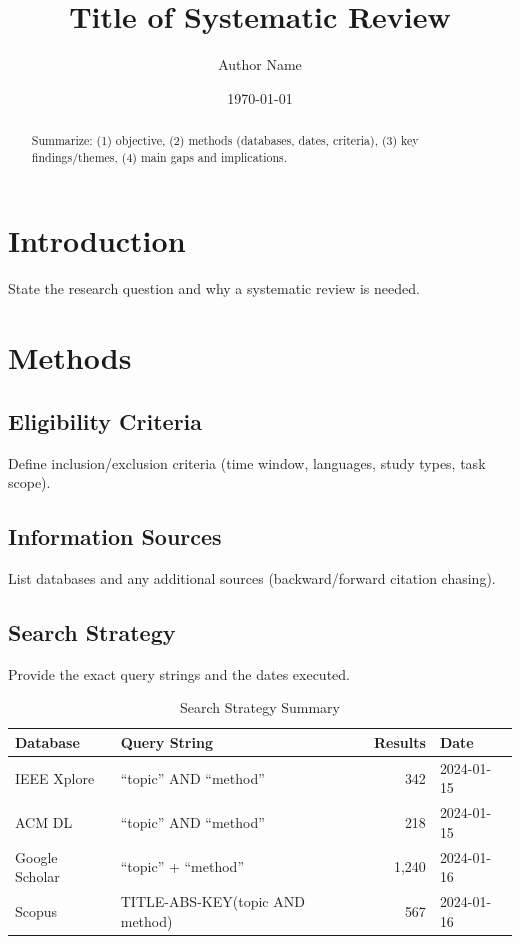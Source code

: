 \documentclass[11pt]{article}
\title{Title of Systematic Review}
\author{Author Name}
\date{\today}
\begin{document}
\maketitle

\begin{abstract}
Summarize: (1) objective, (2) methods (databases, dates, criteria), (3) key findings/themes, (4) main gaps and implications.
\end{abstract}

\section{Introduction}
State the research question and why a systematic review is needed.

\section{Methods}

\subsection{Eligibility Criteria}
Define inclusion/exclusion criteria (time window, languages, study types, task scope).

\subsection{Information Sources}
List databases and any additional sources (backward/forward citation chasing).

\subsection{Search Strategy}
Provide the exact query strings and the dates executed.

\begin{table}[ht]
  \centering
  \caption{Search Strategy Summary}
  \label{tab:search-strategy}
  \begin{tabular}{llrl}
    \toprule
    Database & Query String & Results & Date \\
    \midrule
    IEEE Xplore     & ``topic'' AND ``method''   & 342 & 2024-01-15 \\
    ACM DL          & ``topic'' AND ``method''   & 218 & 2024-01-15 \\
    Google Scholar  & ``topic'' + ``method''     & 1,240 & 2024-01-16 \\
    Scopus          & TITLE-ABS-KEY(topic AND method) & 567 & 2024-01-16 \\
    \bottomrule
  \end{tabular}
\end{table}
\end{document}
